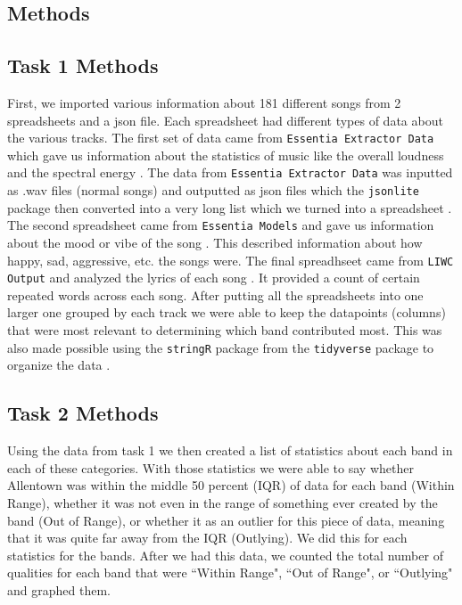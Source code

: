 \documentclass{article}\usepackage[]{graphicx}\usepackage[]{xcolor}
\begin{document}
\begin{multicols}{2}
\section{Methods}


\subsection{Task 1 Methods}

First, we imported various information about
181 different songs from 2 spreadsheets and a json file. Each spreadsheet had different types of data about the various tracks. The first set of data came from \texttt{Essentia Extractor Data} which gave us information about the statistics of music like the overall loudness and the spectral energy \citep{bogdanov2013essentia}. The data from \texttt{Essentia Extractor Data} was inputted as .wav files (normal songs) and outputted as json files which the \texttt{jsonlite} package then converted into a very long list which we turned into a spreadsheet \citep{jsonlite}. The second spreadsheet came from \texttt{Essentia Models} and gave us information about the mood or vibe of the song \citep{9054688}. This described information about how happy, sad, aggressive, etc. the songs were. The final spreadhseet came from \texttt{LIWC Output} and analyzed the lyrics of each song \citep{boyd2022development}. It provided a count of certain repeated words across each song.  After putting all the spreadsheets into one larger one grouped by each track we were able to keep the datapoints (columns) that were most relevant to determining which band contributed most. This was also made possible using the \texttt{stringR} package from the \texttt{tidyverse} package to organize the data \citep{tidyverse}.

\subsection{Task 2 Methods}

Using the data from task 1 we then created a list of statistics about each band in each of these categories. With those statistics we were able to say whether Allentown was within the middle 50 percent (IQR) of data for each band (Within Range), whether it was not even in the range of something ever created by the band (Out of Range), or whether it as an outlier for this piece of data, meaning that it was quite far away from the IQR (Outlying). We did this for each statistics for the bands. After we had this data, we counted the total number of qualities for each band that were ``Within Range", ``Out of Range", or ``Outlying" and graphed them. 



\end{multicols}
\end{document}
